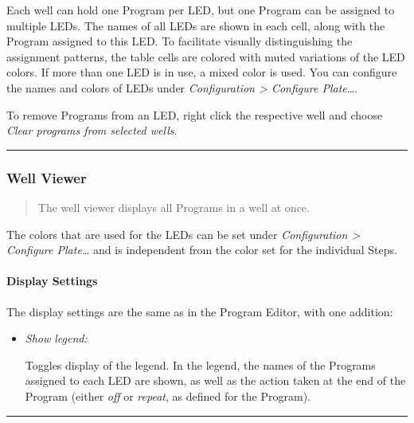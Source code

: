 Each well can hold one Program per LED, but one Program can be assigned
to multiple LEDs. The names of all LEDs are shown in each cell, along
with the Program assigned to this LED. To facilitate visually
distinguishing the assignment patterns, the table cells are colored with
muted variations of the LED colors. If more than one LED is in use, a
mixed color is used. You can configure the names and colors of LEDs
under \emph{Configuration \textgreater{} Configure Plate\ldots{}}.

To remove Programs from an LED, right click the respective well and
choose \emph{Clear programs from selected wells}.

\begin{center}\rule{0.5\linewidth}{0.5pt}\end{center}

\hypertarget{well-viewer}{%
\subsubsection{Well Viewer}\label{well-viewer}}

\begin{quote}
The well viewer displays all Programs in a well at once.
\end{quote}

The colors that are used for the LEDs can be set under
\emph{Configuration \textgreater{} Configure Plate\ldots{}} and is
independent from the color set for the individual Steps.

\hypertarget{display-settings-2}{%
\paragraph{Display Settings}\label{display-settings-2}}

The display settings are the same as in the Program Editor, with one
addition:

\begin{itemize}
\item
  \emph{Show legend:}

  Toggles display of the legend. In the legend, the names of the
  Programs assigned to each LED are shown, as well as the action taken
  at the end of the Program (either \emph{off} or \emph{repeat}, as
  defined for the Program).
\end{itemize}

\begin{center}\rule{0.5\linewidth}{0.5pt}\end{center}

